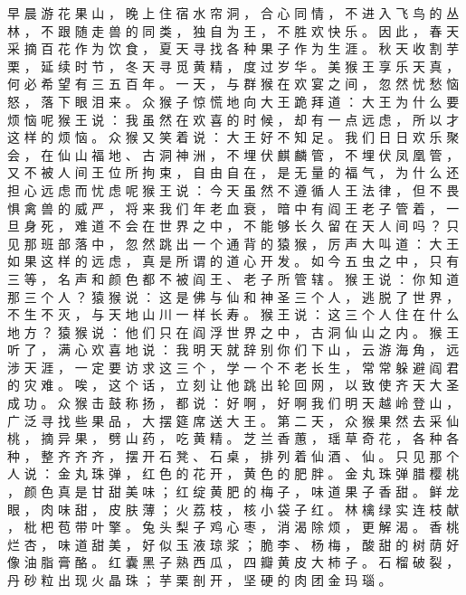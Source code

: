 {早 晨 游 花 果 山 ， 晚 上 住 宿 水 帘 洞 ， 合 心 同 情 ， 不 进 入 飞 鸟 的 丛 林 ， 不 跟 随 走 兽 的 同 类 ， 独 自 为 王 ， 不 胜 欢 快 乐 。
因 此 ， 春 天 采 摘 百 花 作 为 饮 食 ， 夏 天 寻 找 各 种 果 子 作 为 生 涯 。
秋 天 收 割 芋 栗 ， 延 续 时 节 ， 冬 天 寻 觅 黄 精 ， 度 过 岁 华 。
美 猴 王 享 乐 天 真 ， 何 必 希 望 有 三 五 百 年 。
一 天 ， 与 群 猴 在 欢 宴 之 间 ， 忽 然 忧 愁 恼 怒 ， 落 下 眼 泪 来 。
众 猴 子 惊 慌 地 向 大 王 跪 拜 道 ： 大 王 为 什 么 要 烦 恼 呢 猴 王 说 ： 我 虽 然 在 欢 喜 的 时 候 ， 却 有 一 点 远 虑 ， 所 以 才 这 样 的 烦 恼 。
众 猴 又 笑 着 说 ： 大 王 好 不 知 足 。
我 们 日 日 欢 乐 聚 会 ， 在 仙 山 福 地 、 古 洞 神 洲 ， 不 埋 伏 麒 麟 管 ， 不 埋 伏 凤 凰 管 ， 又 不 被 人 间 王 位 所 拘 束 ， 自 由 自 在 ， 是 无 量 的 福 气 ， 为 什 么 还 担 心 远 虑 而 忧 虑 呢 猴 王 说 ： 今 天 虽 然 不 遵 循 人 王 法 律 ， 但 不 畏 惧 禽 兽 的 威 严 ， 将 来 我 们 年 老 血 衰 ， 暗 中 有 阎 王 老 子 管 着 ， 一 旦 身 死 ， 难 道 不 会 在 世 界 之 中 ， 不 能 够 长 久 留 在 天 人 间 吗 ？
只 见 那 班 部 落 中 ， 忽 然 跳 出 一 个 通 背 的 猿 猴 ， 厉 声 大 叫 道 ： 大 王 如 果 这 样 的 远 虑 ， 真 是 所 谓 的 道 心 开 发 。
如 今 五 虫 之 中 ， 只 有 三 等 ， 名 声 和 颜 色 都 不 被 阎 王 、 老 子 所 管 辖 。
猴 王 说 ： 你 知 道 那 三 个 人 ？ 猿 猴 说 ： 这 是 佛 与 仙 和 神 圣 三 个 人 ， 逃 脱 了 世 界 ， 不 生 不 灭 ， 与 天 地 山 川 一 样 长 寿 。
猴 王 说 ： 这 三 个 人 住 在 什 么 地 方 ？ 猿 猴 说 ： 他 们 只 在 阎 浮 世 界 之 中 ， 古 洞 仙 山 之 内 。
猴 王 听 了 ， 满 心 欢 喜 地 说 ： 我 明 天 就 辞 别 你 们 下 山 ， 云 游 海 角 ， 远 涉 天 涯 ， 一 定 要 访 求 这 三 个 ， 学 一 个 不 老 长 生 ， 常 常 躲 避 阎 君 的 灾 难 。
唉 ， 这 个 话 ， 立 刻 让 他 跳 出 轮 回 网 ， 以 致 使 齐 天 大 圣 成 功 。
众 猴 击 鼓 称 扬 ， 都 说 ： 好 啊 ， 好 啊 我 们 明 天 越 岭 登 山 ， 广 泛 寻 找 些 果 品 ， 大 摆 筵 席 送 大 王 。
第 二 天 ， 众 猴 果 然 去 采 仙 桃 ， 摘 异 果 ， 劈 山 药 ， 吃 黄 精 。
芝 兰 香 蕙 ， 瑶 草 奇 花 ， 各 种 各 种 ， 整 齐 齐 齐 ， 摆 开 石 凳 、 石 桌 ， 排 列 着 仙 酒 、 仙 。
只 见 那 个 人 说 ： 金 丸 珠 弹 ， 红 色 的 花 开 ， 黄 色 的 肥 胖 。
金 丸 珠 弹 腊 樱 桃 ， 颜 色 真 是 甘 甜 美 味 ； 红 绽 黄 肥 的 梅 子 ， 味 道 果 子 香 甜 。
鲜 龙 眼 ， 肉 味 甜 ， 皮 肤 薄 ； 火 荔 枝 ， 核 小 袋 子 红 。
林 檎 绿 实 连 枝 献 ， 枇 杷 苞 带 叶 擎 。
兔 头 梨 子 鸡 心 枣 ， 消 渴 除 烦 ， 更 解 渴 。
香 桃 烂 杏 ， 味 道 甜 美 ， 好 似 玉 液 琼 浆 ； 脆 李 、 杨 梅 ， 酸 甜 的 树 荫 好 像 油 脂 膏 酪 。
红 囊 黑 子 熟 西 瓜 ， 四 瓣 黄 皮 大 柿 子 。
石 榴 破 裂 ， 丹 砂 粒 出 现 火 晶 珠 ； 芋 栗 剖 开 ， 坚 硬 的 肉 团 金 玛 瑙 。
}
